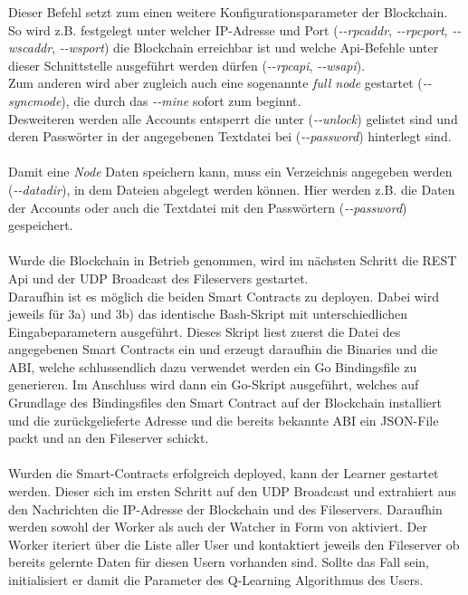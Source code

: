 Dieser Befehl setzt zum einen weitere Konfigurationsparameter der Blockchain. So wird z.B. festgelegt unter welcher IP-Adresse und Port (\textit{-{}-rpcaddr}, \textit{-{}-rpcport}, \textit{-{}-wscaddr}, \textit{-{}-wsport}) die Blockchain erreichbar ist und welche Api-Befehle unter dieser Schnittstelle ausgeführt werden dürfen (\textit{-{}-rpcapi}, \textit{-{}-wsapi}). \\
Zum anderen wird aber zugleich auch eine sogenannte \textit{full node} gestartet (\textit{-{}-syncmode}), die durch das  \textit{-{}-mine} sofort zum  beginnt.\\
Desweiteren werden alle Accounts entsperrt die unter (\textit{-{}-unlock}) gelistet sind und deren Passwörter in der angegebenen Textdatei bei (\textit{-{}-password}) hinterlegt sind. \\\\
Damit eine \textit{Node} Daten speichern kann, muss ein Verzeichnis angegeben werden (\textit{-{}-datadir}), in dem Dateien abgelegt werden können. Hier werden z.B. die Daten der Accounts oder auch die Textdatei mit den Passwörtern (\textit{-{}-password}) gespeichert.\\\\
Wurde die Blockchain in Betrieb genommen, wird im nächsten Schritt die REST Api und der UDP Broadcast des Fileservers gestartet. \\
Daraufhin ist es möglich die beiden Smart Contracts zu deployen. Dabei wird jeweils für 3a) und 3b) das identische Bash-Skript mit unterschiedlichen Eingabeparametern ausgeführt. Dieses Skript liest zuerst die Datei des angegebenen Smart Contracts ein und erzeugt daraufhin die Binaries und die ABI,
welche schlussendlich dazu verwendet werden ein Go Bindingsfile zu generieren.
Im Anschluss wird dann ein Go-Skript ausgeführt, welches auf Grundlage des Bindingsfiles den Smart Contract auf der Blockchain installiert und die zurückgelieferte Adresse und die bereits bekannte ABI ein JSON-File packt und an den Fileserver schickt.\\\\
Wurden die Smart-Contracts erfolgreich deployed, kann der Learner gestartet werden. Dieser  sich im ersten Schritt auf den UDP Broadcast und extrahiert aus den Nachrichten die IP-Adresse der Blockchain und des Fileservers. Daraufhin werden sowohl der Worker als auch der Watcher in Form von  aktiviert. Der Worker iteriert über die Liste aller User und kontaktiert jeweils den Fileserver ob bereits gelernte Daten für diesen Usern vorhanden sind. Sollte das Fall sein, initialisiert er damit die Parameter des Q-Learning Algorithmus des Users.\\
